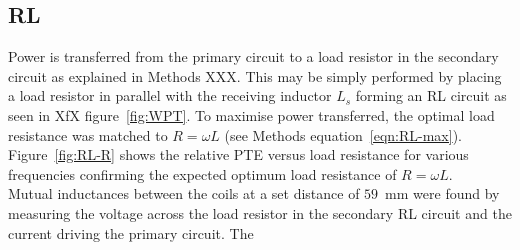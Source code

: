 \documentclass[11pt]{iopart}
\begin{document}
\subsection*{RL}
Power is transferred from the primary circuit to a load resistor in
the secondary circuit as explained in Methods XXX. This may be simply
performed by placing a load resistor in parallel with the receiving
inductor $L_s$ forming an RL circuit as seen in XfX
figure~\ref{fig:WPT}. To maximise power transferred, the optimal load
resistance was matched to $R = \omega L$ (see Methods
equation~\ref{eqn:RL-max}). \\ Figure~\ref{fig:RL-R} shows the
relative PTE versus load resistance for various frequencies confirming
the expected optimum load resistance of $R = \omega L$. \\
Mutual inductances between the coils at a set distance of $59$~mm were
found by measuring the voltage across the load resistor in the
secondary RL circuit and the current driving the primary circuit. The
\end{document}
